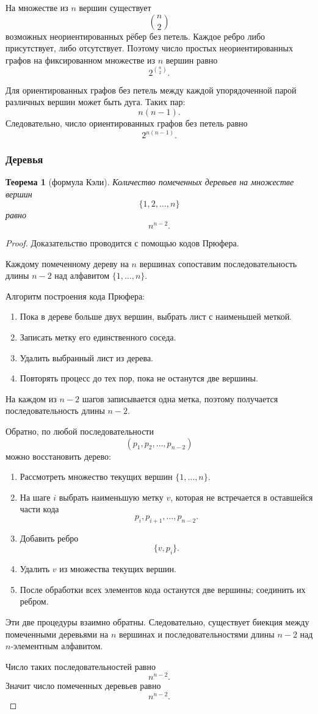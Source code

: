 \documentclass[12pt,a4paper]{article}
\newtheorem{theorem}{Теорема}
\begin{document}
На множестве из $n$ вершин существует
\[
\binom{n}{2}
\]
возможных неориентированных рёбер без петель. Каждое ребро либо присутствует, либо отсутствует. Поэтому число простых неориентированных графов на фиксированном множестве из $n$ вершин равно
\[
2^{\binom{n}{2}}.
\]

Для ориентированных графов без петель между каждой упорядоченной парой различных вершин может быть дуга. Таких пар:
\[
n(n-1).
\]
Следовательно, число ориентированных графов без петель равно
\[
2^{n(n-1)}.
\]

\subsubsection{Деревья}

\begin{theorem}[формула Кэли]
Количество помеченных деревьев на множестве вершин
\[
\{1,2,\dots,n\}
\]
равно
\[
n^{n-2}.
\]
\end{theorem}

\begin{proof}
Доказательство проводится с помощью кодов Прюфера.

Каждому помеченному дереву на $n$ вершинах сопоставим последовательность длины $n-2$ над алфавитом $\{1,\dots,n\}$.

Алгоритм построения кода Прюфера:
\begin{enumerate}
    \item Пока в дереве больше двух вершин, выбрать лист с наименьшей меткой.
    \item Записать метку его единственного соседа.
    \item Удалить выбранный лист из дерева.
    \item Повторять процесс до тех пор, пока не останутся две вершины.
\end{enumerate}

На каждом из $n-2$ шагов записывается одна метка, поэтому получается последовательность длины $n-2$.

Обратно, по любой последовательности
\[
(p_1,p_2,\dots,p_{n-2})
\]
можно восстановить дерево:
\begin{enumerate}
    \item Рассмотреть множество текущих вершин $\{1,\dots,n\}$.
    \item На шаге $i$ выбрать наименьшую метку $v$, которая не встречается в оставшейся части кода
    \[
    p_i,p_{i+1},\dots,p_{n-2}.
    \]
    \item Добавить ребро
    \[
    \{v,p_i\}.
    \]
    \item Удалить $v$ из множества текущих вершин.
    \item После обработки всех элементов кода останутся две вершины; соединить их ребром.
\end{enumerate}

Эти две процедуры взаимно обратны. Следовательно, существует биекция между помеченными деревьями на $n$ вершинах и последовательностями длины $n-2$ над $n$-элементным алфавитом.

Число таких последовательностей равно
\[
n^{n-2}.
\]
Значит число помеченных деревьев равно
\[
n^{n-2}.
\]
\end{proof}
\end{document}
